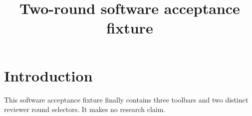 \documentclass[11pt]{article}
\begin{document}
\title{Two-round software acceptance fixture}
\maketitle
\section{Introduction}
This software acceptance fixture finally contains three toolbars and two distinct reviewer round selectors. It makes no research claim.
\end{document}

